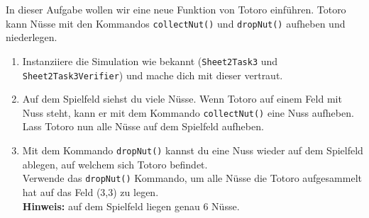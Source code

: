 

In dieser Aufgabe wollen wir eine neue Funktion von Totoro einführen.
Totoro kann Nüsse mit den Kommandos \lstinline{collectNut()} und \lstinline{dropNut()} aufheben und niederlegen.

\begin{enumerate}
\item Instanziiere die Simulation wie bekannt (\lstinline{Sheet2Task3} und \lstinline{Sheet2Task3Verifier}) und mache dich mit dieser vertraut.
\item Auf dem Spielfeld siehst du viele Nüsse.
Wenn Totoro auf einem Feld mit Nuss steht, kann er mit dem Kommando \lstinline{collectNut()} eine Nuss aufheben.\\
Lass Totoro nun alle Nüsse auf dem Spielfeld aufheben.
\item Mit dem Kommando \lstinline{dropNut()} kannst du eine Nuss wieder auf dem Spielfeld ablegen, auf welchem sich Totoro befindet.\\
Verwende das \lstinline{dropNut()} Kommando, um alle Nüsse die Totoro aufgesammelt hat auf das Feld (3,3) zu legen.\\
\textbf{Hinweis:} auf dem Spielfeld liegen genau 6 Nüsse.
\end{enumerate}


